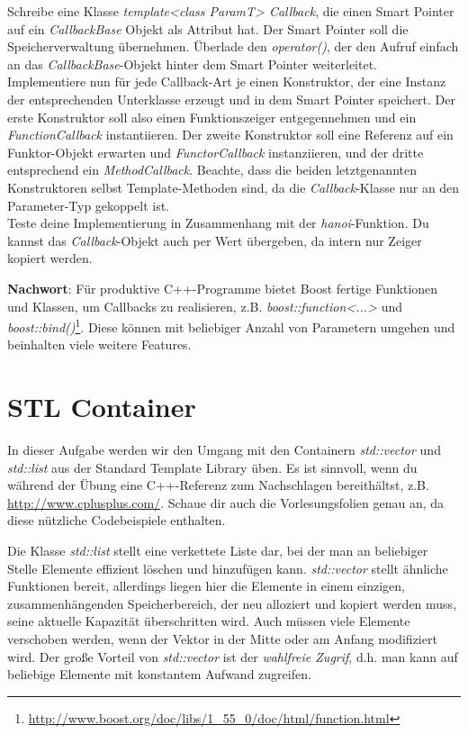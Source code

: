 \begin{enumerate}
Schreibe eine Klasse \emph{template<class ParamT> Callback}, die einen Smart Pointer auf ein \emph{CallbackBase} Objekt als Attribut hat. Der Smart Pointer soll die Speicherverwaltung übernehmen. Überlade den \emph{operator()}, der den Aufruf einfach an das \emph{CallbackBase}-Objekt hinter dem Smart Pointer weiterleitet. \\

Implementiere nun für jede Callback-Art je einen Konstruktor, der eine Instanz der entsprechenden Unterklasse erzeugt und in dem Smart Pointer speichert.
Der erste Konstruktor soll also einen Funktionszeiger entgegennehmen und ein \emph{FunctionCallback} instantiieren.
Der zweite Konstruktor soll eine Referenz auf ein Funktor-Objekt erwarten und  \emph{FunctorCallback} instanziieren, und der dritte entsprechend ein \emph{MethodCallback}.
Beachte, dass die beiden letztgenannten Konstruktoren selbst Template-Methoden sind, da die \emph{Callback}-Klasse nur an den Parameter-Typ gekoppelt ist.\\

Teste deine Implementierung in Zusammenhang mit der \emph{hanoi}-Funktion. Du kannst das \emph{Callback}-Objekt auch per Wert übergeben, da intern nur Zeiger kopiert werden. 

\end{enumerate}

\textbf{Nachwort}:
Für produktive C++-Programme bietet Boost fertige Funktionen und Klassen, um Callbacks zu realisieren, z.B. \emph{boost::function<...>} und \emph{boost::bind()}\footnote{\url{http://www.boost.org/doc/libs/1_55_0/doc/html/function.html}}. Diese können mit beliebiger Anzahl von Parametern umgehen und beinhalten viele weitere Features.



\section{STL Container} 
In dieser Aufgabe werden wir den Umgang mit den Containern \emph{std::vector} und \emph{std::list} aus der Standard Template Library üben.
Es ist sinnvoll, wenn du während der Übung eine C++-Referenz zum Nachschlagen bereithältst, z.B. \url{http://www.cplusplus.com/}.
Schaue dir auch die Vorlesungsfolien genau an, da diese nützliche Codebeispiele enthalten.

Die Klasse \emph{std::list} stellt eine verkettete Liste dar, bei der man an beliebiger Stelle Elemente effizient löschen und hinzufügen kann. \emph{std::vector} stellt ähnliche Funktionen bereit, allerdings liegen hier die Elemente in einem einzigen, zusammenhängenden Speicherbereich, der neu alloziert und kopiert werden muss, seine aktuelle Kapazität überschritten wird.
Auch müssen viele Elemente verschoben werden, wenn der Vektor in der Mitte oder am Anfang modifiziert wird.
Der große Vorteil von \emph{std::vector} ist der \emph{wahlfreie Zugrif}, d.h. man kann auf beliebige Elemente mit konstantem Aufwand zugreifen.

